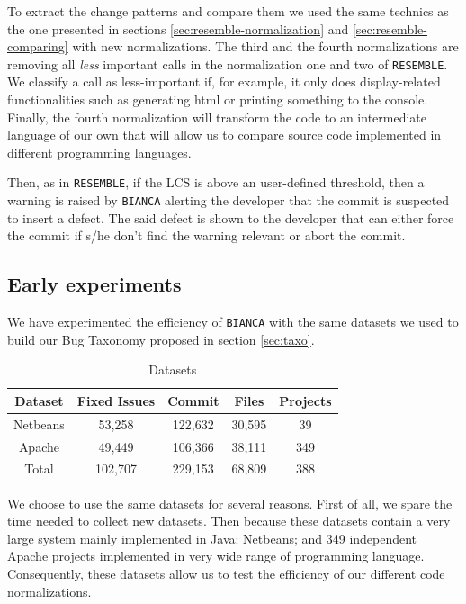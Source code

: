 To extract the change patterns and compare them we used the same technics as the one presented in sections \ref{sec:resemble-normalization} and \ref{sec:resemble-comparing} with new normalizations.
The third and the fourth normalizations are removing all {\it less} important calls in the normalization one and two of {\tt RESEMBLE}.
We classify a call as less-important if, for example, it only does display-related functionalities such as generating html or printing something to the console. Finally, the fourth normalization will transform the code to an intermediate language of our own that will allow us to compare source code implemented in different programming languages.

Then, as in {\tt RESEMBLE}, if the LCS is above an user-defined threshold, then a warning is raised by {\tt BIANCA} alerting the developer that the commit is suspected to insert a defect. The said defect is shown to the developer that can either force the commit if s/he don't find the warning relevant or abort the commit.


\subsection{Early experiments}

We have experimented the efficiency of {\tt BIANCA} with the same datasets we used to build our Bug Taxonomy proposed in section \ref{sec:taxo}.

\begin{table}[h]
\begin{center}
\begin{tabular}{@{}c|c|c|c|c@{}}
\textbf{Dataset} & \textbf{Fixed Issues} & \textbf{Commit} & \textbf{Files} & \textbf{Projects} \\ \hline \hline
Netbeans         & 53,258          & 122,632     & 30,595         & 39                \\
Apache           & 49,449          & 106,366     & 38,111         & 349               \\
Total            & 102,707         & 229,153     & 68,809         & 388               \\ \hline \hline

\end{tabular}
\end{center}

\caption{Datasets\label{table:datasets-bianca}}
\end{table}

We choose to use the same datasets for several reasons. First of all, we spare the time needed to collect new datasets. Then because these datasets contain a very large system mainly implemented in Java: Netbeans; and 349 independent Apache projects implemented in very wide range of programming language. Consequently, these datasets allow us to test the efficiency of our different code normalizations.

